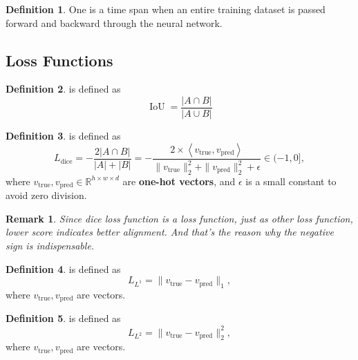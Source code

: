 \documentclass[a4paper]{article}
\theoremstyle{definition}
\newtheorem{definition}{Definition}
\theoremstyle{plain}
\newtheorem{remark}{Remark}
\begin{document}
\begin{definition}
One  is a time span when an entire training dataset is passed forward and backward through the neural network.
\end{definition}

\subsection{Loss Functions}
\begin{definition}
 is defined as 
\begin{equation*}
    \operatorname{IoU}=\frac{|A\cap B|}{|A\cup B|}
\end{equation*}
\end{definition}

\begin{definition}
 is defined as 
\begin{equation*}
    L_{\operatorname{dice}}=-\frac{2|A\cap B|}{|A|+|B|}=-\frac{2\times\left<v_{\operatorname{true}}, v_{\operatorname{pred}}\right>}{\|v_{\operatorname{true}}\|^2_2+\|v_{\operatorname{pred}}\|^2_2+\epsilon}\in(-1,0],
\end{equation*}
where $v_{\operatorname{true}},v_{\operatorname{pred}}\in\mathbb{R}^{h\times w\times d}$ are \textbf{one-hot vectors}, and $\epsilon$ is a small constant to avoid zero division. 
\end{definition}

\begin{remark}
Since dice loss function is a loss function, just as other loss function, lower score indicates better alignment. And that's the reason why the negative sign is indispensable.
\end{remark}

\begin{definition}
 is defined as 
\begin{equation*}
    L_{L^1}=\|v_{\operatorname{true}}-v_{\operatorname{pred}}\|_1,
\end{equation*}
where $v_{\operatorname{true}},v_{\operatorname{pred}}$ are vectors.
\end{definition}

\begin{definition}
 is defined as 
\begin{equation*}
    L_{L^2}=\|v_{\operatorname{true}}-v_{\operatorname{pred}}\|^2_2,
\end{equation*}
where $v_{\operatorname{true}},v_{\operatorname{pred}}$ are vectors.
\end{definition}
\end{document}
